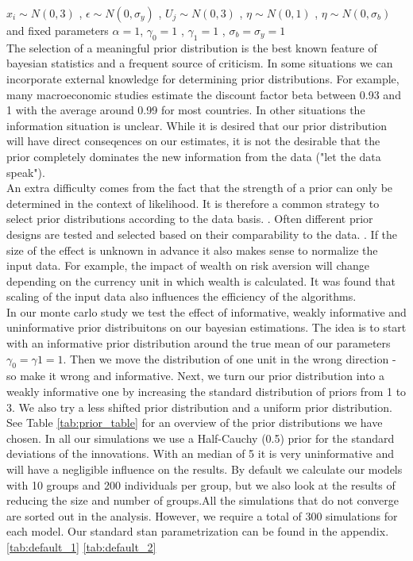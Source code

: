 $x_i \sim N(0,3)$ ,  $\epsilon \sim N(0,\sigma_y) $ , $U_j \sim N(0,3)$ , $\eta \sim N(0,1) $ , $\eta \sim N(0,\sigma_b)$\\
and fixed parameters $\alpha=1$, $\gamma_0=1$ , $\gamma_1=1$ , $\sigma_b=\sigma_y=1$ \\

The selection of a meaningful prior distribution is the best known feature of bayesian statistics and a frequent source of criticism. In some situations we can incorporate external knowledge for determining prior distributions. For example, many macroeconomic studies estimate the discount factor beta  between 0.93 and 1 with the average around 0.99 for most countries.  \cite{rumler2007}
In other situations the information situation is unclear. While it is desired that our prior distribution will have direct conseqences on our estimates, it is not the desirable that the prior completely dominates the new information from the data ("let the data speak").\\
An extra difficulty comes from the fact that the strength of a prior can only be determined in the context of likelihood. It is therefore a common strategy to select prior distributions according to the data basis. \cite{gelman2017prior}. 
Often different prior designs are tested and selected based on their comparability to the data. \cite{leeper2017clearing}.
If the size of the effect is unknown in advance it also makes sense to normalize the input data. For example, the impact of wealth on risk aversion will change depending on the currency unit in which wealth is calculated. It was found that scaling of the input data also influences the efficiency of the algorithms.\cite{gelman2008weakly} \\
In our monte carlo study we test the effect of informative, weakly informative and uninformative prior distribuitons on our bayesian estimations.
The idea is to start with an informative prior distribution around the true mean of our parameters $\gamma_0=\gamma1=1$. Then we move the distribution of one unit in the wrong direction - so make it wrong and informative.
Next, we turn our prior distribution into a weakly informative one by increasing the standard distribution of priors from 1 to 3.
We also try a less shifted prior distribution and a uniform prior distribution. See Table \ref{tab:prior_table} for an overview of the prior distributions we have chosen.
In all our simulations we use a Half-Cauchy (0.5) prior for the standard deviations of the innovations. With an median of 5 it is very uninformative and will have a negligible influence on the results.
By default we calculate our models with 10 groups and 200 individuals per group, but we also look at the results of reducing the size and number of groups.All the simulations that do not converge are sorted out in the analysis. However, we require a total of 300 simulations for each model. Our standard stan parametrization can be found in the appendix. \ref{tab:default_1} \ref{tab:default_2}


